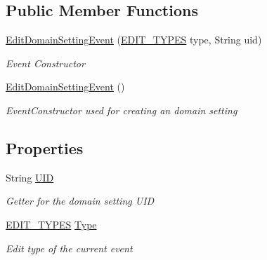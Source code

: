 \subsection*{Public Member Functions}
\begin{DoxyCompactItemize}
\item 
\hyperlink{class_web_analyzer_1_1_events_1_1_edit_domain_setting_event_ad3da8a162d7b3cb9e02b350d79f6d2b8}{Edit\+Domain\+Setting\+Event} (\hyperlink{class_web_analyzer_1_1_events_1_1_edit_domain_setting_event_a1a22be020f4b06370ab3a64893272b44}{E\+D\+I\+T\+\_\+\+T\+Y\+P\+E\+S} type, String uid)
\begin{DoxyCompactList}\small\item\em Event Constructor \end{DoxyCompactList}\item 
\hyperlink{class_web_analyzer_1_1_events_1_1_edit_domain_setting_event_a655e4143dd9e0e787a73fe4163b168ed}{Edit\+Domain\+Setting\+Event} ()
\begin{DoxyCompactList}\small\item\em Event\+Constructor used for creating an domain setting \end{DoxyCompactList}\end{DoxyCompactItemize}
\subsection*{Properties}
\begin{DoxyCompactItemize}
\item 
String \hyperlink{class_web_analyzer_1_1_events_1_1_edit_domain_setting_event_ad1c58d61b04b924664078c684161f861}{U\+I\+D}
\begin{DoxyCompactList}\small\item\em Getter for the domain setting U\+I\+D \end{DoxyCompactList}\item 
\hyperlink{class_web_analyzer_1_1_events_1_1_edit_domain_setting_event_a1a22be020f4b06370ab3a64893272b44}{E\+D\+I\+T\+\_\+\+T\+Y\+P\+E\+S} \hyperlink{class_web_analyzer_1_1_events_1_1_edit_domain_setting_event_a36f36d7fa2adf9fb69c62c4dbdcf034e}{Type}
\begin{DoxyCompactList}\small\item\em Edit type of the current event \end{DoxyCompactList}\end{DoxyCompactItemize}
